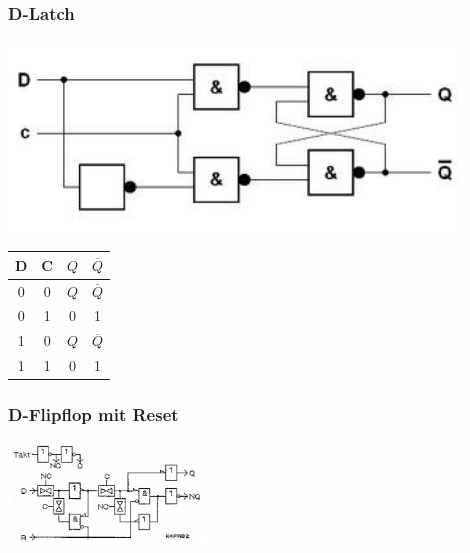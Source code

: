 \begin{multicols}{2}
		\subsubsection{D-Latch}
			\begin{minipage}{4 cm}
				\includegraphics[width=0.9\textwidth]{pics/dlatch}
			\end{minipage}
			\begin{minipage}{4 cm}
				\begin{tabular}{|cc|cc|}
					\hline
						D & C & $Q$ & $\overline{Q}$ \\
					\hline	
						0 & 0 & $Q$ & $\overline{Q}$ \\
						0 & 1 & 0 & 1 \\
						1 & 0 & $Q$ & $\overline{Q}$ \\
						1 & 1 & 0 & 1 \\
					\hline
				\end{tabular}
			\end{minipage}
			
		\subsubsection{D-Flipflop mit Reset}
			\includegraphics[width=0.4\textwidth]{pics/dflipflop}
	\end{multicols}
	
